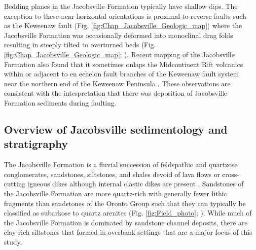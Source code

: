 Bedding planes in the Jacobsville Formation typically have shallow dips. The exception to these near-horizontal orientations is proximal to reverse faults such as the Keweenaw fault (Fig. \ref{fig:Chap_Jacobsville_Geologic_map}) where the Jacobsville Formation was occasionally deformed into monoclinal drag folds resulting in steeply tilted to overturned beds (Fig. \ref{fig:Chap_Jacobsville_Geologic_map}; \citealp{Irving1885a, Cannon2001a}). Recent mapping of the Jacobsville Formation also found that it sometimes onlaps the Midcontinent Rift volcanics within or adjacent to en echelon fault branches of the Keweenaw fault system near the northern end of the Keweenaw Peninsula \citep{Tyrrell2019a, Mueller2021a}. These observations are consistent with the interpretation that there was deposition of Jacobsville Formation sediments during faulting.

\subsection*{Overview of Jacobsville sedimentology and stratigraphy}

The Jacobsville Formation is a fluvial succession of feldspathic and quartzose conglomerates, sandstones, siltstones, and shales devoid of lava flows or cross-cutting igneous dikes although internal clastic dikes are present \citep{Hamblin1958a}. Sandstones of the Jacobsville Formation are more quartz-rich with generally fewer lithic fragments than sandstones of the Oronto Group such that they can typically be classified as subarkose to quartz arenites (Fig. \ref{fig:Field_photo}; \citealp{Hamblin1958a, Ojakangas2002a}). While much of the Jacobsville Formation is dominated by sandstone channel deposits, there are clay-rich siltstones that formed in overbank settings that are a major focus of this study.

